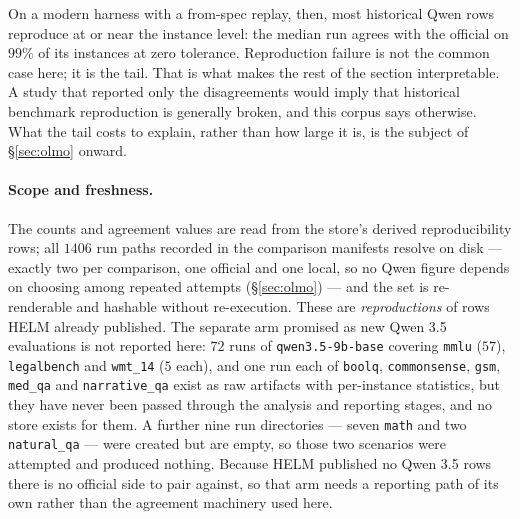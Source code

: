 On a modern harness with a from-spec replay, then, most historical Qwen rows
reproduce at or near the instance level: the median run agrees with the official
on $99\%$ of its instances at zero tolerance. Reproduction failure is not the
common case here; it is the tail. That is what makes the rest of the section
interpretable. A study that reported only the disagreements would imply that
historical benchmark reproduction is generally broken, and this corpus says
otherwise. What the tail costs to explain, rather than how large it is, is the
subject of \S\ref{sec:olmo} onward.

\paragraph{Scope and freshness.} The counts and agreement values are read from the
store's derived reproducibility rows; all $1406$ run paths recorded in the
comparison manifests resolve on disk --- exactly two per comparison, one official
and one local, so no Qwen figure depends on choosing among repeated attempts
(\S\ref{sec:olmo}) --- and the set is re-renderable and hashable without
re-execution. These are \emph{reproductions} of rows HELM already
published. The separate arm promised as new Qwen 3.5 evaluations is not reported
here: $72$ runs of \texttt{qwen3.5-9b-base} covering \texttt{mmlu} ($57$),
\texttt{legalbench} and \texttt{wmt\_14} ($5$ each), and one run each of
\texttt{boolq}, \texttt{commonsense}, \texttt{gsm}, \texttt{med\_qa} and
\texttt{narrative\_qa} exist as raw artifacts with per-instance statistics, but
they have never been passed through the analysis and reporting stages, and no
store exists for them. A further nine run directories --- seven \texttt{math} and
two \texttt{natural\_qa} --- were created but are empty, so those two scenarios
were attempted and produced nothing. Because HELM published no Qwen 3.5 rows there is no official
side to pair against, so that arm needs a reporting path of its own rather than
the agreement machinery used here.

